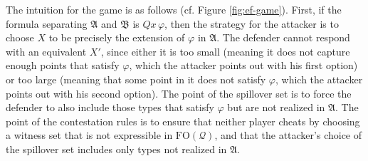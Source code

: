 \documentclass{article}
\theoremstyle{definition}
\begin{document}
The intuition for the game is as follows (cf. Figure \ref{fig:ef-game}). First, if the formula separating $\mathfrak{A}$ and $\mathfrak{B}$ is $Qx\,\varphi$, then the strategy for the attacker is to choose $X$ to be precisely the extension of $\varphi$ in $\mathfrak{A}$. The defender cannot respond with an equivalent $X'$, since either it is too small (meaning it does not capture enough points that satisfy $\varphi$, which the attacker points out with his first option) or too large (meaning that some point in it does not satisfy $\varphi$, which the attacker points out with his second option). The point of the spillover set is to force the defender to also include those types that satisfy $\varphi$ but are not realized in $\mathfrak{A}$. The point of the contestation rules is to ensure that neither player cheats by choosing a witness set that is not expressible in $\mathrm{FO}(\mathcal{Q})$, and that the attacker's choice of the spillover set includes only types not realized in $\mathfrak{A}$.
\end{document}
